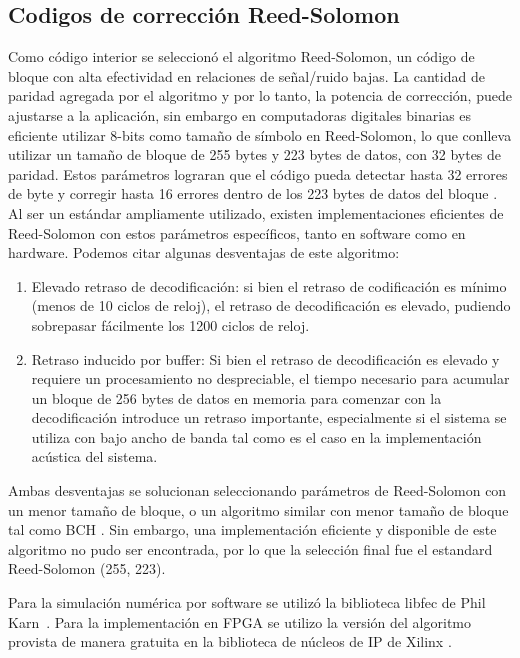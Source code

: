 \subsection{Codigos de corrección Reed-Solomon}
Como código interior se seleccionó el algoritmo Reed-Solomon, un código de bloque con alta efectividad en relaciones de señal/ruido bajas. La cantidad de paridad agregada por el algoritmo y por lo tanto, la potencia de corrección, puede ajustarse a la aplicación, sin embargo en computadoras digitales binarias es eficiente utilizar 8-bits como tamaño de símbolo en Reed-Solomon, lo que conlleva utilizar un tamaño de bloque de 255 bytes y 223 bytes de datos, con 32 bytes de paridad. Estos parámetros lograran que el código pueda detectar hasta 32 errores de byte y corregir hasta 16 errores dentro de los 223 bytes de datos del bloque \cite{reed1960polynomial}. Al ser un estándar ampliamente utilizado, existen implementaciones eficientes de Reed-Solomon con estos parámetros específicos, tanto en software como en hardware.
Podemos citar algunas desventajas de este algoritmo:
\begin{enumerate}
 \item Elevado retraso de decodificación: si bien el retraso de codificación es mínimo (menos de 10 ciclos de reloj), el retraso de decodificación es elevado, pudiendo sobrepasar fácilmente los 1200 ciclos de reloj.
 \item Retraso inducido por buffer: Si bien el retraso de decodificación es elevado y requiere un procesamiento no despreciable, el tiempo necesario para acumular un bloque de 256 bytes de datos en memoria para comenzar con la decodificación introduce un retraso importante, especialmente si el sistema se utiliza con bajo ancho de banda tal como es el caso en la implementación acústica del sistema.
\end{enumerate}
 
Ambas desventajas se solucionan seleccionando parámetros de Reed-Solomon con un menor tamaño de bloque, o un algoritmo similar con menor tamaño de bloque tal como BCH \cite{bose1960class}. Sin embargo, una implementación eficiente
 y disponible de este algoritmo no pudo ser encontrada, por lo que la selección final fue el estandard Reed-Solomon (255, 223).

Para la simulación numérica por software se utilizó la biblioteca libfec de Phil Karn~\cite{libfec}. Para la implementación en FPGA se utilizo la versión del algoritmo provista de manera gratuita en la biblioteca de núcleos de IP de Xilinx \cite{Xilinx:DS251}.


